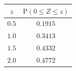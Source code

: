 {\setlength{\tabcolsep}{5pt}\renewcommand{\arraystretch}{1.25}%
\begin{tabular}{|c|c|}
\hline
$z$ & $\mathrm{P}(0\le Z\le z)$ \\
\hline
$0.5$ & $0.1915$ \\
\hline
$1.0$ & $0.3413$ \\
\hline
$1.5$ & $0.4332$ \\
\hline
$2.0$ & $0.4772$ \\
\hline
\end{tabular}}
